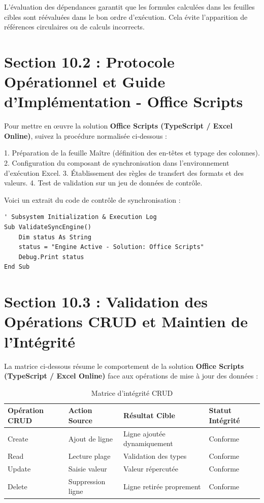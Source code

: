 \documentclass[12pt,a4paper]{report}
\begin{document}
L'évaluation des dépendances garantit que les formules calculées dans les feuilles cibles sont réévaluées dans le bon ordre d'exécution. Cela évite l'apparition de références circulaires ou de calculs incorrects.


\section{Section 10.2 : Protocole Opérationnel et Guide d'Implémentation - Office Scripts}
Pour mettre en œuvre la solution \textbf{Office Scripts (TypeScript / Excel Online)}, suivez la procédure normalisée ci-dessous :

1. Préparation de la feuille Maître (définition des en-têtes et typage des colonnes).
2. Configuration du composant de synchronisation dans l'environnement d'exécution Excel.
3. Établissement des règles de transfert des formats et des valeurs.
4. Test de validation sur un jeu de données de contrôle.

Voici un extrait du code de contrôle de synchronisation :
\begin{lstlisting}[caption=Code de controle operationnel]
' Subsystem Initialization & Execution Log
Sub ValidateSyncEngine()
    Dim status As String
    status = "Engine Active - Solution: Office Scripts"
    Debug.Print status
End Sub
\end{lstlisting}


\section{Section 10.3 : Validation des Opérations CRUD et Maintien de l'Intégrité}
La matrice ci-dessous résume le comportement de la solution \textbf{Office Scripts (TypeScript / Excel Online)} face aux opérations de mise à jour des données :

\begin{table}[h]
\centering
\begin{tabular}{@{}llll@{}}
\toprule
\textbf{Opération CRUD} & \textbf{Action Source} & \textbf{Résultat Cible} & \textbf{Statut Intégrité} \\ \midrule
Create & Ajout de ligne & Ligne ajoutée dynamiquement & Conforme \\
Read & Lecture plage & Validation des types & Conforme \\
Update & Saisie valeur & Valeur répercutée & Conforme \\
Delete & Suppression ligne & Ligne retirée proprement & Conforme \\ \bottomrule
\end{tabular}
\caption{Matrice d'intégrité CRUD}
\end{table}
\end{document}
